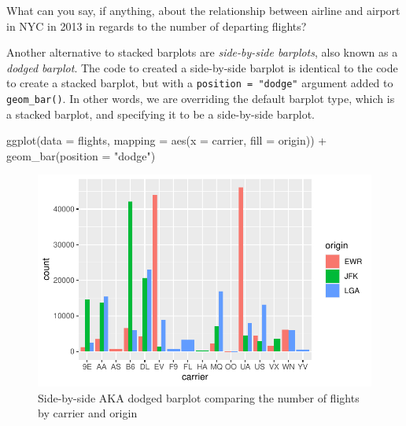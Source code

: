 \documentclass[
  letterpaper,
  DIV=11,
  numbers=noendperiod]{scrreprt}
\newenvironment{Shaded}{\begin{snugshade}}{\end{snugshade}}
\newcommand{\AttributeTok}[1]{\textcolor[rgb]{0.40,0.45,0.13}{#1}}
\newcommand{\FunctionTok}[1]{\textcolor[rgb]{0.28,0.35,0.67}{#1}}
\newcommand{\NormalTok}[1]{\textcolor[rgb]{0.00,0.23,0.31}{#1}}
\newcommand{\SpecialCharTok}[1]{\textcolor[rgb]{0.37,0.37,0.37}{#1}}
\newcommand{\StringTok}[1]{\textcolor[rgb]{0.13,0.47,0.30}{#1}}
\theoremstyle{definition}
\theoremstyle{remark}
\begin{document}
\begin{tcolorbox}[enhanced jigsaw, coltitle=black, toprule=.15mm, bottomtitle=1mm, breakable, leftrule=.75mm, title={{🎯} Learning Check 2.33}, opacitybacktitle=0.6, colback=white, rightrule=.15mm, opacityback=0, toptitle=1mm, colbacktitle=quarto-callout-tip-color!10!white, colframe=quarto-callout-tip-color-frame, titlerule=0mm, arc=.35mm, bottomrule=.15mm, left=2mm]
What can you say, if anything, about the relationship between airline
and airport in NYC in 2013 in regards to the number of departing
flights?
\end{tcolorbox}

Another alternative to stacked barplots are \emph{side-by-side
barplots}, also known as a \emph{dodged barplot}. The code to created a
side-by-side barplot is identical to the code to create a stacked
barplot, but with a \texttt{position\ =\ "dodge"} argument added to
\texttt{geom\_bar()}. In other words, we are overriding the default
barplot type, which is a stacked barplot, and specifying it to be a
side-by-side barplot.

\begin{Shaded}
\begin{Highlighting}[]
\FunctionTok{ggplot}\NormalTok{(}\AttributeTok{data =}\NormalTok{ flights, }\AttributeTok{mapping =} \FunctionTok{aes}\NormalTok{(}\AttributeTok{x =}\NormalTok{ carrier, }\AttributeTok{fill =}\NormalTok{ origin)) }\SpecialCharTok{+}
  \FunctionTok{geom\_bar}\NormalTok{(}\AttributeTok{position =} \StringTok{"dodge"}\NormalTok{)}
\end{Highlighting}
\end{Shaded}

\begin{figure}[H]

{\centering \includegraphics{02-visualization_files/figure-pdf/fig-flights-bar-dodge-1.pdf}

}

\caption{\label{fig-flights-bar-dodge}Side-by-side AKA dodged barplot
comparing the number of flights by carrier and origin}

\end{figure}
\end{document}
